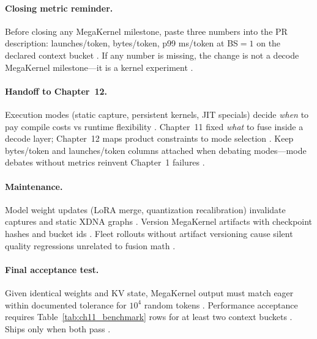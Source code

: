 \paragraph{Closing metric reminder.} Before closing any MegaKernel milestone, paste three numbers into the PR description: launches/token, bytes/token, p99 ms/token at BS${=}1$ on the declared context bucket \citep{taxbreak2026,memoryfloor2026,patel2025llminference}. If any number is missing, the change is not a decode MegaKernel milestone---it is a kernel experiment \citep{yirage2026,chen2020compilerbasedhardw,dao2022flashattention,liu2024deepseekv3,kwon2023vllm,nvidia2024cudagraphs,amd2024aie,semianalysis2024tma,dao2023flashdecoding,dlbook}.

\paragraph{Handoff to Chapter~12.} Execution modes (static capture, persistent kernels, JIT specials) decide \emph{when} to pay compile costs vs runtime flexibility \citep{nvidia2024cudagraphs,yirage2026,amd2024xdna}. Chapter~11 fixed \emph{what} to fuse inside a decode layer; Chapter~12 maps product constraints to mode selection \citep{kwon2023vllm,patel2025llminference,liu2024deepseekv3}. Keep bytes/token and launches/token columns attached when debating modes---mode debates without metrics reinvent Chapter~1 failures \citep{taxbreak2026,memoryfloor2026,dao2022flashattention}.

\paragraph{Maintenance.} Model weight updates (LoRA merge, quantization recalibration) invalidate captures and static XDNA graphs \citep{yirage2026,amd2024aie,nvidia2024cudagraphs}. Version MegaKernel artifacts with checkpoint hashes and bucket ids \citep{patel2025llminference,kwon2023vllm}. Fleet rollouts without artifact versioning cause silent quality regressions unrelated to fusion math \citep{liu2024deepseekv3,taxbreak2026,memoryfloor2026,chen2020compilerbasedhardw,dlbook,semianalysis2024tma,dao2023flashdecoding}.

\paragraph{Final acceptance test.} Given identical weights and KV state, MegaKernel output must match eager within documented tolerance for $10^4$ random tokens \citep{dao2022flashattention,dlbook}. Performance acceptance requires Table~\ref{tab:ch11_benchmark} rows for at least two context buckets \citep{dao2023flashdecoding,kwon2023vllm}. Ships only when both pass \citep{patel2025llminference,yirage2026,taxbreak2026,memoryfloor2026,nvidia2024cudagraphs,chen2020compilerbasedhardw,liu2024deepseekv3,amd2024aie,semianalysis2024tma,amd2024xdna}.

